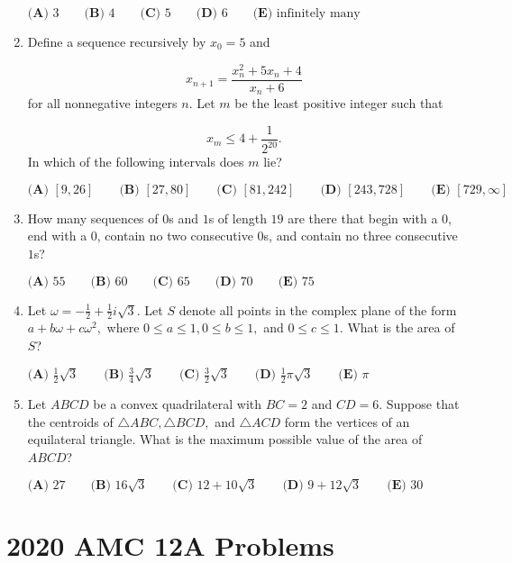 \documentclass{article}
\begin{document}
\begin{enumerate}[label=\arabic*., itemsep=0.5em]
\(\textbf{(A) } 3 \qquad\textbf{(B) } 4 \qquad\textbf{(C) } 5 \qquad\textbf{(D) } 6 \qquad\textbf{(E) } \text{infinitely many}\)\par \vspace{0.5em}\item Define a sequence recursively by \(x_0=5\) and

\begin{equation*}
x_{n+1}=\frac{x_n^2+5x_n+4}{x_n+6}
\end{equation*}
for all nonnegative integers \(n.\) Let \(m\) be the least positive integer such that

\begin{equation*}
x_m\leq 4+\frac{1}{2^{20}}.
\end{equation*}
In which of the following intervals does \(m\) lie?

\(\textbf{(A) } [9,26] \qquad\textbf{(B) } [27,80] \qquad\textbf{(C) } [81,242]\qquad\textbf{(D) } [243,728] \qquad\textbf{(E) } [729,\infty]\)\par \vspace{0.5em}\item How many sequences of \(0\)s and \(1\)s of length \(19\) are there that begin with a \(0\), end with a \(0\), contain no two consecutive \(0\)s, and contain no three consecutive \(1\)s?

\(\textbf{(A) }55\qquad\textbf{(B) }60\qquad\textbf{(C) }65\qquad\textbf{(D) }70\qquad\textbf{(E) }75\)\par \vspace{0.5em}\item Let \(\omega=-\tfrac{1}{2}+\tfrac{1}{2}i\sqrt3.\) Let \(S\) denote all points in the complex plane of the form \(a+b\omega+c\omega^2,\) where \(0\leq a \leq 1,0\leq b\leq 1,\) and \(0\leq c\leq 1.\) What is the area of \(S\)?

\(\textbf{(A) } \frac{1}{2}\sqrt3 \qquad\textbf{(B) } \frac{3}{4}\sqrt3 \qquad\textbf{(C) } \frac{3}{2}\sqrt3\qquad\textbf{(D) } \frac{1}{2}\pi\sqrt3 \qquad\textbf{(E) } \pi\)\par \vspace{0.5em}\item Let \(ABCD\) be a convex quadrilateral with \(BC=2\) and \(CD=6.\) Suppose that the centroids of \(\triangle ABC,\triangle BCD,\) and \(\triangle ACD\) form the vertices of an equilateral triangle. What is the maximum possible value of the area of \(ABCD\)?

\(\textbf{(A) } 27 \qquad\textbf{(B) } 16\sqrt3 \qquad\textbf{(C) } 12+10\sqrt3 \qquad\textbf{(D) } 9+12\sqrt3 \qquad\textbf{(E) } 30\)\par \vspace{0.5em}
\end{enumerate}
\newpage\section*{2020 AMC 12A Problems}
\end{document}
